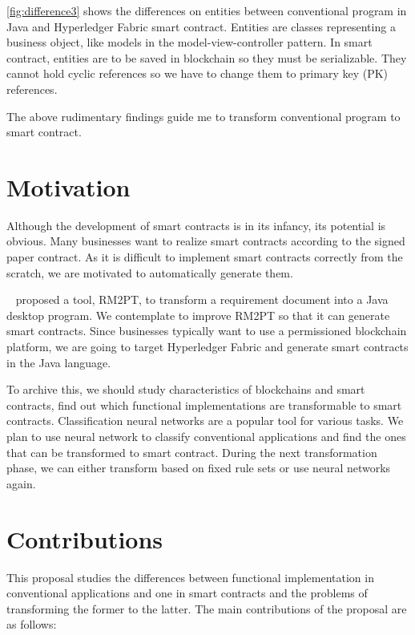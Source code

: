 \autoref{fig:difference3} shows the differences on entities between conventional program in Java and Hyperledger Fabric smart contract.
Entities are classes representing a business object, like models in the model-view-controller pattern.
In smart contract, entities are to be saved in blockchain so they must be serializable. They cannot hold cyclic references so we have to change them to primary key (PK) references.

The above rudimentary findings guide me to transform conventional program to smart contract.

\section{Motivation}


Although the development of smart contracts is in its infancy, its potential is obvious. Many businesses want to realize smart contracts according to the signed paper contract.
As it is difficult to implement smart contracts correctly from the scratch,
we are motivated to automatically generate them.

~\cite{yang2019automated} proposed a tool, RM2PT, to transform a requirement document into a Java desktop program.
We contemplate to improve RM2PT so that it can generate smart contracts.
Since businesses typically want to use a permissioned blockchain platform, we are going to target Hyperledger Fabric and generate smart contracts in the Java language.

To archive this, we should study characteristics of blockchains and smart contracts, find out which functional implementations are transformable to smart contracts.
Classification neural networks are a popular tool for various tasks.
We plan to use neural network to classify conventional applications and find the ones that can be transformed to smart contract.
During the next transformation phase, we can either transform based on fixed rule sets or use neural networks again.




\section{Contributions}
This proposal studies the differences between functional implementation in conventional applications and one in smart contracts
and the problems of transforming the former to the latter.
The main contributions of the proposal are as follows:

